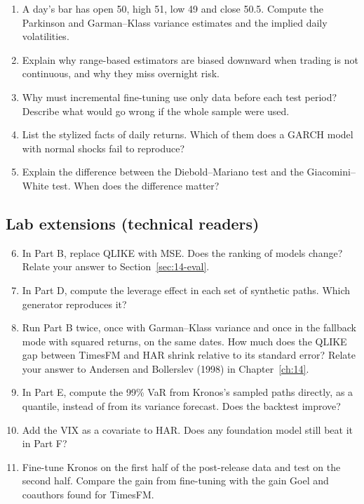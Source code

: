 \begin{enumerate}
  \item A day's bar has open 50, high 51, low 49 and close 50.5. Compute the Parkinson and Garman--Klass variance estimates and the implied daily volatilities.
  \item Explain why range-based estimators are biased downward when trading is not continuous, and why they miss overnight risk.
  \item Why must incremental fine-tuning use only data before each test period? Describe what would go wrong if the whole sample were used.
  \item List the stylized facts of daily returns. Which of them does a GARCH model with normal shocks fail to reproduce?
  \item Explain the difference between the Diebold--Mariano test and the Giacomini--White test. When does the difference matter?
\end{enumerate}

\subsection*{Lab extensions (technical readers)}

\begin{enumerate}
  \setcounter{enumi}{5}
  \item In Part B, replace QLIKE with MSE. Does the ranking of models change? Relate your answer to Section~\ref{sec:14-eval}.
  \item In Part D, compute the leverage effect in each set of synthetic paths. Which generator reproduces it?
  \item Run Part B twice, once with Garman--Klass variance and once in the fallback mode with squared returns, on the same dates. How much does the QLIKE gap between TimesFM and HAR shrink relative to its standard error? Relate your answer to Andersen and Bollerslev (1998) in Chapter~\ref{ch:14}.
  \item In Part E, compute the 99\% VaR from Kronos's sampled paths directly, as a quantile, instead of from its variance forecast. Does the backtest improve?
  \item Add the VIX as a covariate to HAR. Does any foundation model still beat it in Part F?
  \item Fine-tune Kronos on the first half of the post-release data and test on the second half. Compare the gain from fine-tuning with the gain Goel and coauthors found for TimesFM.
\end{enumerate}
